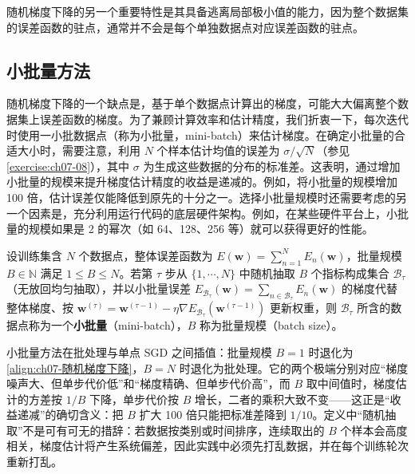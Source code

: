 \documentclass[../../main.tex]{subfiles}
\begin{document}
随机梯度下降的另一个重要特性是其具备逃离局部极小值的能力，因为整个数据集的误差函数的驻点，通常并不会是每个单独数据点对应误差函数的驻点。

\subsection{小批量方法}\label{subsection:ch07-小批量方法}

随机梯度下降的一个缺点是，基于单个数据点计算出的梯度，可能大大偏离整个数据集上误差函数的梯度。为了兼顾计算效率和估计精度，我们折衷一下，每次迭代时使用一小批数据点（称为小批量，mini-batch）来估计梯度。在确定小批量的合适大小时，需要注意，利用 $N$ 个样本估计均值的误差为 $\sigma/\sqrt{N}$（参见\cref{exercise:ch07-08}），其中 $\sigma$ 为生成这些数据的分布的标准差。这表明，通过增加小批量的规模来提升梯度估计精度的收益是递减的。例如，将小批量的规模增加 100 倍，估计误差仅能降低到原先的十分之一。选择小批量规模时还需要考虑的另一个因素是，充分利用运行代码的底层硬件架构。例如，在某些硬件平台上，小批量的规模如果是 2 的幂次（如 64、128、256 等）就可以获得更好的性能。

\begin{definition}[小批量]\label{definition:ch07-小批量}
设训练集含 $N$ 个数据点，整体误差函数为 $E(\mathbf{w})=\sum_{n=1}^{N}E_{n}(\mathbf{w})$，批量规模 $B\in\mathbb{N}$ 满足 $1\leqslant B\leqslant N$。若第 $\tau$ 步从 $\{1,\cdots,N\}$ 中随机抽取 $B$ 个指标构成集合 $\mathcal{B}_{\tau}$（无放回均匀抽取），并以小批量误差 $E_{\mathcal{B}_{\tau}}(\mathbf{w})=\sum_{n\in\mathcal{B}_{\tau}}E_{n}(\mathbf{w})$ 的梯度代替整体梯度、按 $\mathbf{w}^{(\tau)}=\mathbf{w}^{(\tau-1)}-\eta\nabla E_{\mathcal{B}_{\tau}}(\mathbf{w}^{(\tau-1)})$ 更新权重，则 $\mathcal{B}_{\tau}$ 所含的数据点称为一个\textbf{小批量}（mini-batch），$B$ 称为批量规模（batch size）。
\end{definition}

\begin{remark}
小批量方法在批处理与单点 SGD 之间插值：批量规模 $B=1$ 时退化为\eqref{align:ch07-随机梯度下降}，$B=N$ 时退化为批处理。它的两个极端分别对应“梯度噪声大、但单步代价低”和“梯度精确、但单步代价高”，而 $B$ 取中间值时，梯度估计的方差按 $1/B$ 下降，单步代价按 $B$ 增长，二者的乘积大致不变——这正是“收益递减”的确切含义：把 $B$ 扩大 100 倍只能把标准差降到 $1/10$。定义中“随机抽取”不是可有可无的措辞：若数据按类别或时间排序，连续取出的 $B$ 个样本会高度相关，梯度估计将产生系统偏差，因此实践中必须先打乱数据，并在每个训练轮次重新打乱。
\end{remark}
\end{document}

